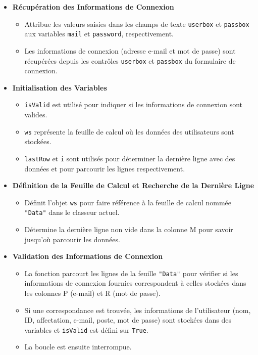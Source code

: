 \documentclass[a4paper, oneside, 12pt, final]{extreport}
\begin{document}
\begin{itemize}
    \item \textbf{Récupération des Informations de Connexion}
    \begin{itemize}
        \item Attribue les valeurs saisies dans les champs de texte \texttt{userbox} et \texttt{passbox} aux variables \texttt{mail} et \texttt{password}, respectivement.
        \item Les informations de connexion (adresse e-mail et mot de passe) sont récupérées depuis les contrôles \texttt{userbox} et \texttt{passbox} du formulaire de connexion.
    \end{itemize}

    \item \textbf{Initialisation des Variables}
    \begin{itemize}
        \item \texttt{isValid} est utilisé pour indiquer si les informations de connexion sont valides.
        \item \texttt{ws} représente la feuille de calcul où les données des utilisateurs sont stockées.
        \item \texttt{lastRow} et \texttt{i} sont utilisés pour déterminer la dernière ligne avec des données et pour parcourir les lignes respectivement.
    \end{itemize}

    \item \textbf{Définition de la Feuille de Calcul et Recherche de la Dernière Ligne}
    \begin{itemize}
        \item Définit l'objet \texttt{ws} pour faire référence à la feuille de calcul nommée \texttt{"Data"} dans le classeur actuel.
        \item Détermine la dernière ligne non vide dans la colonne M pour savoir jusqu'où parcourir les données.
    \end{itemize}

    \item \textbf{Validation des Informations de Connexion}
    \begin{itemize}
        \item La fonction parcourt les lignes de la feuille \texttt{"Data"} pour vérifier si les informations de connexion fournies correspondent à celles stockées dans les colonnes P (e-mail) et R (mot de passe).
        \item Si une correspondance est trouvée, les informations de l'utilisateur (nom, ID, affectation, e-mail, poste, mot de passe) sont stockées dans des variables et \texttt{isValid} est défini sur \texttt{True}.
        \item La boucle est ensuite interrompue.
    \end{itemize}


\end{itemize}
\end{document}
